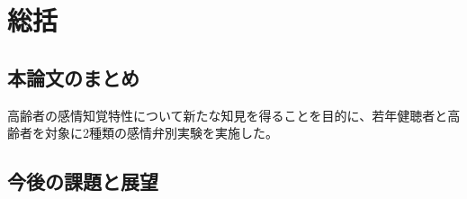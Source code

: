 \chapter{総括}
\section{本論文のまとめ}
\label{sec:Summary}
高齢者の感情知覚特性について新たな知見を得ることを目的に、若年健聴者と高齢者を対象に2種類の感情弁別実験を実施した。




\section{今後の課題と展望}
\label{sec:Challenges}



